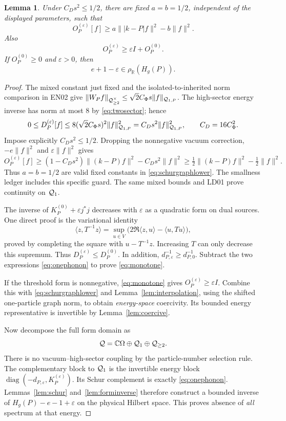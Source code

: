 \documentclass[11pt,a4paper]{article}
\newtheorem{lemma}[theorem]{Lemma}
\theoremstyle{remark}\newtheorem{remark}[theorem]{Remark}
\newcommand{\R}{\mathbb R}\newcommand{\C}{\mathbb C}\newcommand{\N}{\mathbb N}
\newcommand{\ip}[2]{\langle #1,#2\rangle}\newcommand{\norm}[1]{\lVert #1\rVert}
\newcommand{\abs}[1]{\lvert #1\rvert}\newcommand{\rankone}[2]{\lvert #1\rangle\langle #2\rvert}
\newcommand{\resR}{\rho_{\R}}
\begin{document}
\begin{lemma}\label{lem:nearresolvent}
Under $C_Ds^2\leq1/2$, there are fixed $a=b=1/2$, independent of the displayed parameters, such that
\begin{equation}
 O_P^{(\varepsilon)}[f]\geq a\norm{\abs{k-P}f}^2-b\norm f^2.\label{eq:schurgraphlower}
\end{equation}
Also
\begin{equation}
 O_P^{(\varepsilon)}\geq\varepsilon I+O_P^{(0)}.\label{eq:monotone}
\end{equation}
If $O_P^{(0)}\geq0$ and $\varepsilon>0$, then
\[
 e+1-\varepsilon\in\resR(H_g(P)).
\]
\end{lemma}
\begin{proof}
The mixed constant just fixed and the isolated-to-inherited norm comparison in EN02 give
$\norm{W_Pf}_{\Q_{\geq2}^{\times}}\leq\sqrt2 C_\Phi s\norm f_{\Q_{1,P}}$.
The high-sector energy inverse has norm at most $8$ by \eqref{eq:twosector}; hence
\[
 0\leq D_P^{(\varepsilon)}[f]
 \leq8(\sqrt2 C_\Phi s)^2\norm f_{\Q_{1,P}}^2
 = C_Ds^2\norm f_{\Q_{1,P}}^2,
 \qquad C_D=16C_\Phi^2.
\]
Impose explicitly $C_Ds^2\leq1/2$. Dropping the nonnegative vacuum correction, $-e\|f\|^2$ and $\varepsilon\|f\|^2$ gives
\[
 O_P^{(\varepsilon)}[f]\geq
 (1-C_Ds^2)\|(k-P)f\|^2-C_Ds^2\|f\|^2
 \geq\tfrac12\|(k-P)f\|^2-\tfrac12\|f\|^2.
\]
Thus $a=b=1/2$ are valid fixed constants in \eqref{eq:schurgraphlower}. The smallness ledger includes this specific guard. The same mixed bounds and LD01 prove continuity on $\mathcal Q_1$.

The inverse of $K_P^{(0)}+\varepsilon j^*j$ decreases with $\varepsilon$ as a quadratic form on dual sources. One direct proof is the variational identity
\[
 \ip z{T^{-1}z}=\sup_{u\in V}\bigl(2\Re\ip z u-\ip u{Tu}\bigr),
\]
proved by completing the square with $u-T^{-1}z$. Increasing $T$ can only decrease this supremum. Thus $D_P^{(\varepsilon)}\leq D_P^{(0)}$. In addition, $d_{P,\varepsilon}^{-1}\geq d_{P,0}^{-1}$. Subtract the two expressions \eqref{eq:onephonon} to prove \eqref{eq:monotone}.

If the threshold form is nonnegative, \eqref{eq:monotone} gives $O_P^{(\varepsilon)}\geq\varepsilon I$. Combine this with \eqref{eq:schurgraphlower} and Lemma~\ref{lem:interpolation}, using the shifted one-particle graph norm, to obtain \emph{energy-space} coercivity. Its bounded energy representative is invertible by Lemma~\ref{lem:coercive}.

Now decompose the full form domain as
\[
 \Q=\C\Omega\oplus\Q_1\oplus\Q_{\geq2}.
\]
There is no vacuum--high-sector coupling by the particle-number selection rule. The complementary block to $\mathcal Q_1$ is the invertible energy block $\operatorname{diag}(-d_{P,\varepsilon},K_P^{(\varepsilon)})$. Its Schur complement is exactly \eqref{eq:onephonon}. Lemmas~\ref{lem:schur} and~\ref{lem:forminverse} therefore construct a bounded inverse of $H_g(P)-e-1+\varepsilon$ on the physical Hilbert space. This proves absence of \emph{all} spectrum at that energy.
\end{proof}
\end{document}

